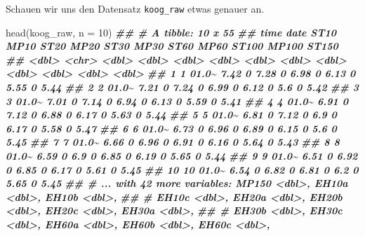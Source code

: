 \documentclass[
]{article}
\newenvironment{Shaded}{\begin{snugshade}}{\end{snugshade}}
\newcommand{\AttributeTok}[1]{\textcolor[rgb]{0.77,0.63,0.00}{#1}}
\newcommand{\DecValTok}[1]{\textcolor[rgb]{0.00,0.00,0.81}{#1}}
\newcommand{\DocumentationTok}[1]{\textcolor[rgb]{0.56,0.35,0.01}{\textbf{\textit{#1}}}}
\newcommand{\FunctionTok}[1]{\textcolor[rgb]{0.00,0.00,0.00}{#1}}
\newcommand{\NormalTok}[1]{#1}
\begin{document}
Schauen wir uns den Datensatz \texttt{koog\_raw} etwas genauer an.

\begin{Shaded}
\begin{Highlighting}[]
\FunctionTok{head}\NormalTok{(koog\_raw, }\AttributeTok{n =} \DecValTok{10}\NormalTok{)}
\DocumentationTok{\#\# \# A tibble: 10 x 55}
\DocumentationTok{\#\#     time date   ST10  MP10  ST20  MP20  ST30  MP30  ST60  MP60 ST100 MP100 ST150}
\DocumentationTok{\#\#    \textless{}dbl\textgreater{} \textless{}chr\textgreater{} \textless{}dbl\textgreater{} \textless{}dbl\textgreater{} \textless{}dbl\textgreater{} \textless{}dbl\textgreater{} \textless{}dbl\textgreater{} \textless{}dbl\textgreater{} \textless{}dbl\textgreater{} \textless{}dbl\textgreater{} \textless{}dbl\textgreater{} \textless{}dbl\textgreater{} \textless{}dbl\textgreater{}}
\DocumentationTok{\#\#  1     1 01.0\textasciitilde{}  7.42     0  7.28     0  6.98     0  6.13     0  5.55     0  5.44}
\DocumentationTok{\#\#  2     2 01.0\textasciitilde{}  7.21     0  7.24     0  6.99     0  6.12     0  5.6      0  5.42}
\DocumentationTok{\#\#  3     3 01.0\textasciitilde{}  7.01     0  7.14     0  6.94     0  6.13     0  5.59     0  5.41}
\DocumentationTok{\#\#  4     4 01.0\textasciitilde{}  6.91     0  7.12     0  6.88     0  6.17     0  5.63     0  5.44}
\DocumentationTok{\#\#  5     5 01.0\textasciitilde{}  6.81     0  7.12     0  6.9      0  6.17     0  5.58     0  5.47}
\DocumentationTok{\#\#  6     6 01.0\textasciitilde{}  6.73     0  6.96     0  6.89     0  6.15     0  5.6      0  5.45}
\DocumentationTok{\#\#  7     7 01.0\textasciitilde{}  6.66     0  6.96     0  6.91     0  6.16     0  5.64     0  5.43}
\DocumentationTok{\#\#  8     8 01.0\textasciitilde{}  6.59     0  6.9      0  6.85     0  6.19     0  5.65     0  5.44}
\DocumentationTok{\#\#  9     9 01.0\textasciitilde{}  6.51     0  6.92     0  6.85     0  6.17     0  5.61     0  5.45}
\DocumentationTok{\#\# 10    10 01.0\textasciitilde{}  6.54     0  6.82     0  6.81     0  6.2      0  5.65     0  5.45}
\DocumentationTok{\#\# \# ... with 42 more variables: MP150 \textless{}dbl\textgreater{}, EH10a \textless{}dbl\textgreater{}, EH10b \textless{}dbl\textgreater{},}
\DocumentationTok{\#\# \#   EH10c \textless{}dbl\textgreater{}, EH20a \textless{}dbl\textgreater{}, EH20b \textless{}dbl\textgreater{}, EH20c \textless{}dbl\textgreater{}, EH30a \textless{}dbl\textgreater{},}
\DocumentationTok{\#\# \#   EH30b \textless{}dbl\textgreater{}, EH30c \textless{}dbl\textgreater{}, EH60a \textless{}dbl\textgreater{}, EH60b \textless{}dbl\textgreater{}, EH60c \textless{}dbl\textgreater{},}

\end{Highlighting}
\end{Shaded}
\end{document}

